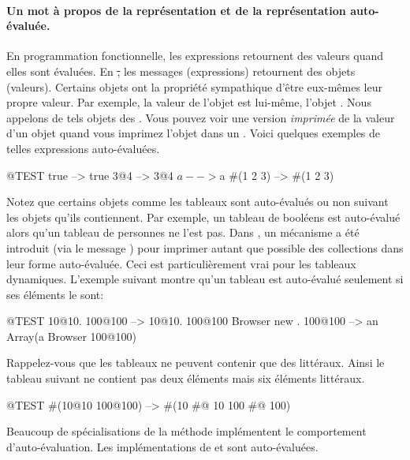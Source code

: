 \documentclass[a4paper,10pt,twoside]{book}
\begin{document}
\paragraph{Un mot \`a propos de la repr\'esentation et de la repr\'esentation auto-\'evalu\'ee.}
En programmation fonctionnelle, les expressions retournent des valeurs quand elles sont \'evalu\'ees. En \st, les messages (expressions) retournent des objets (valeurs). Certains objets ont la propri\'et\'e sympathique d'\^etre eux-m\^emes leur propre valeur. Par exemple, la valeur de l'objet  est lui-m\^eme, \ie l'objet . Nous appelons de tels objets des . Vous pouvez voir une version  \emph{imprim\'ee} de la valeur d'un objet quand vous imprimez l'objet dans un . Voici quelques exemples de telles expressions auto-\'evalu\'ees. 

\begin{code}{@TEST}
true     --> true
3@4      --> 3@4
$a       --> $a
#(1 2 3) --> #(1 2 3)
\end{code}

Notez que certains objets comme les tableaux sont auto-\'evalu\'es ou
non suivant les objets qu'ils contiennent. Par exemple, un tableau de
bool\'eens est auto-\'evalu\'e alors qu'un tableau de personnes ne
l'est pas. Dans , un m\'ecanisme a \'et\'e introduit (via le
message ) pour imprimer autant que
possible des collections dans leur forme auto-\'evalu\'ee. Ceci est particuli\`erement vrai pour les tableaux dynamiques. L'exemple suivant montre qu'un tableau  est auto-\'evalu\'e seulement si ses \'el\'ements le sont:
\begin{code}{@TEST}
{10@10. 100@100}          --> {10@10. 100@100}
{Browser new . 100@100}    --> an Array(a Browser 100@100)
\end{code}

Rappelez-vous que les tableaux  ne peuvent contenir que des litt\'eraux. Ainsi le tableau suivant ne contient pas deux \'el\'ements mais six \'el\'ements litt\'eraux.
\begin{code}{@TEST}
#(10@10 100@100) --> #(10 #@ 10 100 #@ 100)
\end{code}

Beaucoup de sp\'ecialisations de la m\'ethode  impl\'ementent le comportement d'auto-\'evaluation. Les impl\'ementations de  et  sont auto-\'evalu\'ees.
\end{document}
